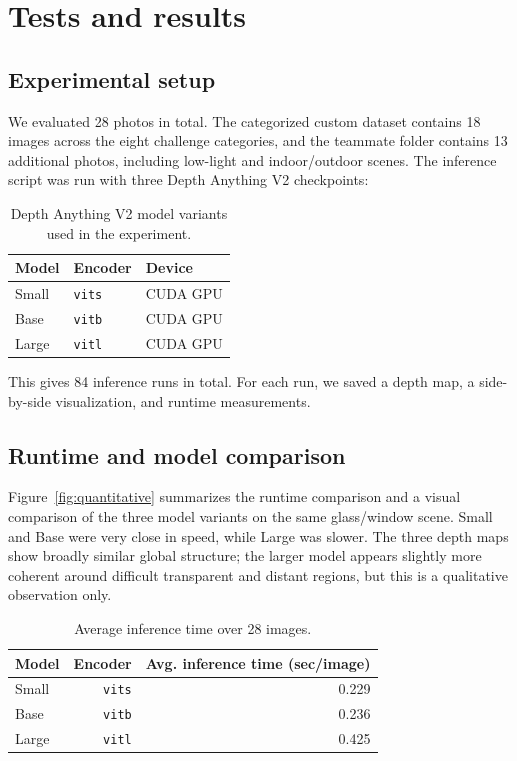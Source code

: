 \documentclass[10pt,a4paper]{article}
\begin{document}
\section{Tests and results}

\subsection{Experimental setup}

We evaluated 28 photos in total. The categorized custom dataset contains 18 images across the eight challenge categories, and the teammate folder contains 13 additional photos, including low-light and indoor/outdoor scenes. The inference script was run with three Depth Anything V2 checkpoints:

\begin{table}[htbp]
\centering
\caption{Depth Anything V2 model variants used in the experiment.}
\begin{tabular}{lll}
\toprule
Model & Encoder & Device \\
\midrule
Small & \texttt{vits} & CUDA GPU \\
Base & \texttt{vitb} & CUDA GPU \\
Large & \texttt{vitl} & CUDA GPU \\
\bottomrule
\end{tabular}
\end{table}

This gives 84 inference runs in total. For each run, we saved a depth map, a side-by-side visualization, and runtime measurements.

\subsection{Runtime and model comparison}

Figure~\ref{fig:quantitative} summarizes the runtime comparison and a visual comparison of the three model variants on the same glass/window scene. Small and Base were very close in speed, while Large was slower. The three depth maps show broadly similar global structure; the larger model appears slightly more coherent around difficult transparent and distant regions, but this is a qualitative observation only.

\begin{table}[htbp]
\centering
\caption{Average inference time over 28 images.}
\begin{tabular}{lrr}
\toprule
Model & Encoder & Avg. inference time (sec/image) \\
\midrule
Small & \texttt{vits} & 0.229 \\
Base & \texttt{vitb} & 0.236 \\
Large & \texttt{vitl} & 0.425 \\
\bottomrule
\end{tabular}
\end{table}
\end{document}
